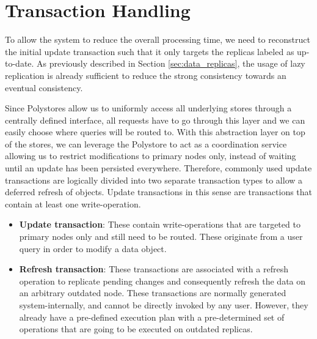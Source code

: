 
\section{Transaction Handling}
\label{sec:tx_handling}

To allow the system to reduce the overall processing time, we need to reconstruct the initial update transaction such that it only 
targets the replicas labeled as up-to-date. As previously described in Section \ref{sec:data_replicas}, the usage of lazy replication is already sufficient to reduce the strong
consistency towards an eventual consistency.

Since Polystores allow us to uniformly access all underlying stores through a centrally defined interface, 
all requests have to go through this layer and we can easily choose where queries will be routed to. 
With this abstraction layer on top of the stores, we can leverage the Polystore to act as a coordination service allowing us to restrict modifications to primary nodes only, 
instead of waiting until an update has been persisted everywhere.
Therefore, commonly used update transactions are logically divided into two separate transaction types to allow a deferred refresh of objects.
Update transactions in this sense are transactions that contain at least one write-operation.
\begin{itemize}
    \item \textbf{Update transaction}:  These contain write-operations that are targeted to primary nodes only and still need to be routed. 
                                        These originate from a user query in order to modify a data object.

    \item \textbf{Refresh transaction}: These transactions are associated with a refresh operation to replicate pending changes and consequently refresh the data on an arbitrary outdated node.
                                        These transactions are normally generated system-internally, and cannot be directly invoked by any user. 
                                        However, they already have a pre-defined execution plan with a pre-determined set of operations that are going to be executed on outdated replicas.               
\end{itemize}


